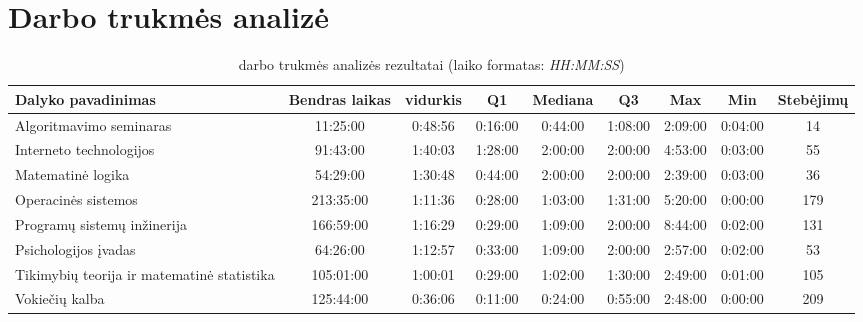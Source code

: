 \chapter{Darbo trukmės analizė}

\begin{sidewaystable}
\centering
\begin{tabular}{|l|c|c|c|c|c|c|c|c|}
  \hline
  {\bf Dalyko pavadinimas} & {\bf Bendras laikas} & {\bf vidurkis } & {\bf Q1 } & {\bf Mediana} & {\bf Q3} & {\bf Max} & {\bf Min} & {\bf Stebėjimų}  \\
  \hline
  Algoritmavimo seminaras & 11:25:00 & 0:48:56 & 0:16:00 & 0:44:00 & 1:08:00 & 2:09:00 & 0:04:00 & 14 \\
  \hline
  Interneto technologijos & 91:43:00 & 1:40:03 & 1:28:00 & 2:00:00 & 2:00:00 & 4:53:00 & 0:03:00 & 55 \\
  \hline
  Matematinė logika & 54:29:00  & 1:30:48 & 0:44:00 & 2:00:00 & 2:00:00 & 2:39:00 & 0:03:00 & 36 \\
  \hline
  Operacinės sistemos & 213:35:00 & 1:11:36 & 0:28:00 & 1:03:00 & 1:31:00 & 5:20:00 & 0:00:00 & 179 \\
  \hline
  Programų sistemų inžinerija & 166:59:00 & 1:16:29 & 0:29:00 &1:09:00 & 2:00:00 & 8:44:00 & 0:02:00 & 131 \\
  \hline
  Psichologijos įvadas & 64:26:00 & 1:12:57 & 0:33:00 & 1:09:00 & 2:00:00 & 2:57:00 & 0:02:00 & 53 \\
  \hline
  Tikimybių teorija ir matematinė statistika & 105:01:00 & 1:00:01 & 0:29:00 & 1:02:00 & 1:30:00 & 2:49:00 & 0:01:00 & 105 \\
  \hline
  Vokiečių kalba & 125:44:00 & 0:36:06 & 0:11:00 & 0:24:00 & 0:55:00 & 2:48:00 & 0:00:00 & 209 \\
  \hline
\end{tabular}
\caption{darbo trukmės analizės rezultatai (laiko formatas:
  \emph{HH:MM:SS})}
\end{sidewaystable}
